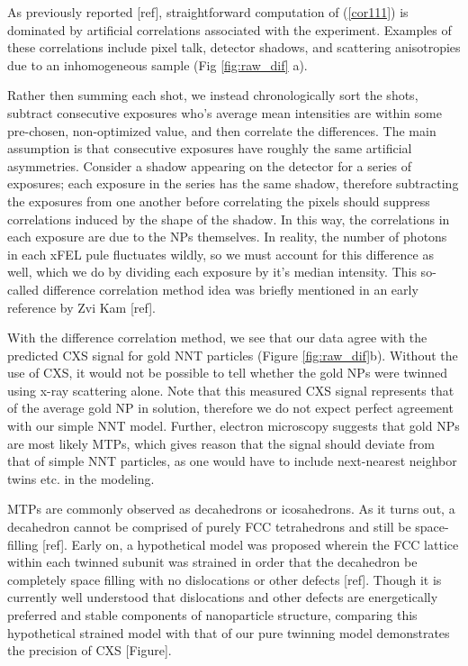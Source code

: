 \documentclass [11pt,fleqn]{article}
\begin{document}
As previously reported [ref], straightforward computation of (\ref{cor111}) is dominated by artificial correlations associated with the experiment. Examples of these correlations include pixel talk, detector shadows, and scattering anisotropies due to an inhomogeneous sample (Fig \ref{fig:raw_dif} a).

Rather then summing each shot, we instead chronologically sort the shots, subtract consecutive exposures who's average mean intensities are within some pre-chosen, non-optimized value, and then correlate the differences. The main assumption is that consecutive exposures have roughly the same artificial asymmetries. Consider a shadow appearing on the detector for a series of exposures; each exposure in the series has the same shadow, therefore subtracting the exposures from one another before correlating the pixels should suppress correlations induced by the shape of the shadow. In this way, the correlations in each exposure are due to the NPs themselves. In reality, the number of photons in each xFEL pule fluctuates wildly, so we must account for this difference as well, which we do by dividing each exposure by it's median intensity. This so-called difference correlation method idea was briefly mentioned in an early reference by Zvi Kam [ref].

With the difference correlation method, we see that our data agree with the predicted CXS signal for gold NNT particles (Figure \ref{fig:raw_dif}b). Without the use of CXS, it would not be possible to tell whether the gold NPs were twinned using x-ray scattering alone. Note that this measured CXS signal represents that of the average gold NP in solution, therefore we do not expect perfect agreement with our simple NNT model. Further, electron microscopy suggests that gold NPs are most likely MTPs, which gives reason that the signal should deviate from that of simple NNT particles, as one would have to include next-nearest neighbor twins etc. in the modeling.

MTPs are commonly observed as decahedrons or icosahedrons. As it turns out, a decahedron cannot be comprised of purely FCC tetrahedrons and still be space-filling [ref]. Early on, a hypothetical model was proposed wherein the FCC lattice within each twinned subunit was strained in order that the decahedron be completely space filling with no dislocations or other defects [ref]. Though it is currently well understood that dislocations and other defects are energetically preferred and stable components of nanoparticle structure, comparing this hypothetical strained model with that of our pure twinning model demonstrates the precision of CXS [Figure].
\end{document}
